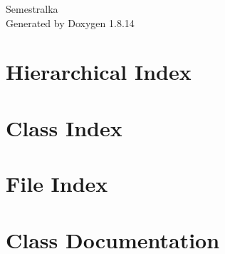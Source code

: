 \documentclass[twoside]{book}
\newcommand{\+}{\discretionary{\mbox{\scriptsize$\hookleftarrow$}}{}{}}
\newcommand{\clearemptydoublepage}{%
  \newpage{\pagestyle{empty}\cleardoublepage}%
}
\begin{document}
\hypersetup{pageanchor=false,
             bookmarksnumbered=true,
             pdfencoding=unicode
            }
\begin{titlepage}
\vspace*{7cm}
\begin{center}%
{\Large Semestralka }\\
\vspace*{1cm}
{\large Generated by Doxygen 1.8.14}\\
\end{center}
\end{titlepage}
\clearemptydoublepage
{}
\tableofcontents
\clearemptydoublepage
{}
\hypersetup{pageanchor=true}

\chapter{Hierarchical Index}

\chapter{Class Index}

\chapter{File Index}

\chapter{Class Documentation}






















\end{document}
